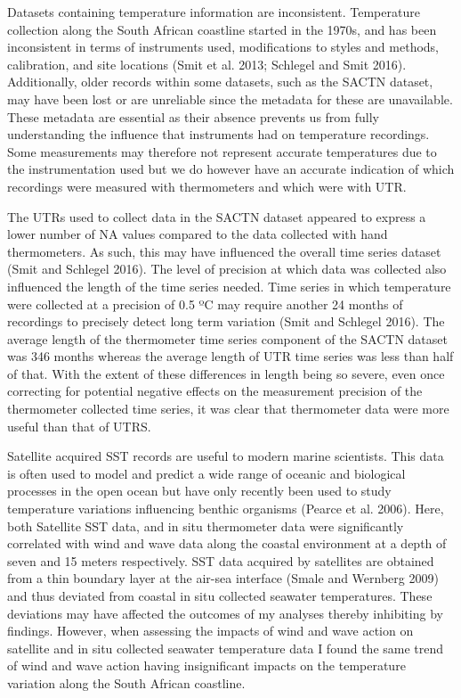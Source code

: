\documentclass[12pt,]{article}
\begin{document}
Datasets containing temperature information are inconsistent.
Temperature collection along the South African coastline started in the
1970s, and has been inconsistent in terms of instruments used,
modifications to styles and methods, calibration, and site locations
(Smit et al. 2013; Schlegel and Smit 2016). Additionally, older records
within some datasets, such as the SACTN dataset, may have been lost or
are unreliable since the metadata for these are unavailable. These
metadata are essential as their absence prevents us from fully
understanding the influence that instruments had on temperature
recordings. Some measurements may therefore not represent accurate
temperatures due to the instrumentation used but we do however have an
accurate indication of which recordings were measured with thermometers
and which were with UTR.

The UTRs used to collect data in the SACTN dataset appeared to express a
lower number of NA values compared to the data collected with hand
thermometers. As such, this may have influenced the overall time series
dataset (Smit and Schlegel 2016). The level of precision at which data
was collected also influenced the length of the time series needed. Time
series in which temperature were collected at a precision of 0.5 ºC may
require another 24 months of recordings to precisely detect long term
variation (Smit and Schlegel 2016). The average length of the
thermometer time series component of the SACTN dataset was 346 months
whereas the average length of UTR time series was less than half of
that. With the extent of these differences in length being so severe,
even once correcting for potential negative effects on the measurement
precision of the thermometer collected time series, it was clear that
thermometer data were more useful than that of UTRS.

Satellite acquired SST records are useful to modern marine scientists.
This data is often used to model and predict a wide range of oceanic and
biological processes in the open ocean but have only recently been used
to study temperature variations influencing benthic organisms (Pearce et
al. 2006). Here, both Satellite SST data, and in situ thermometer data
were significantly correlated with wind and wave data along the coastal
environment at a depth of seven and 15 meters respectively. SST data
acquired by satellites are obtained from a thin boundary layer at the
air-sea interface (Smale and Wernberg 2009) and thus deviated from
coastal in situ collected seawater temperatures. These deviations may
have affected the outcomes of my analyses thereby inhibiting by
findings. However, when assessing the impacts of wind and wave action on
satellite and in situ collected seawater temperature data I found the
same trend of wind and wave action having insignificant impacts on the
temperature variation along the South African coastline.
\end{document}
